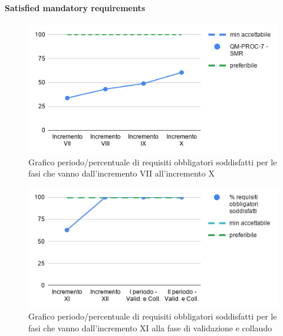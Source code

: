 \paragraph{Satisfied mandatory requirements}
	\begin{figure}[H]
			\centering
			\includegraphics[width=0.8\linewidth]{./res/images/QM-PROC-7-SMR.png}
			\caption{Grafico periodo/percentuale di requisiti obbligatori soddisfatti per le fasi che vanno dall'incremento VII all'incremento X}
			\label{fig:Grafico periodo/percentuale di requisiti obbligatori soddisfatti per le fasi che vanno dall'incremento VII all'incremento X}
	\end{figure}
	\begin{figure}[H]
			\centering
			\includegraphics[width=0.8\linewidth]{./res/images/QM-PROC-7-SMR_1.png}
			\caption{Grafico periodo/percentuale di requisiti obbligatori soddisfatti per le fasi che vanno dall'incremento XI alla fase di validazione e collaudo}
			\label{fig:Grafico periodo/percentuale di requisiti obbligatori soddisfatti per le fasi che vanno dall'incremento XI alla fase di validazione e collaudo}
	\end{figure}
